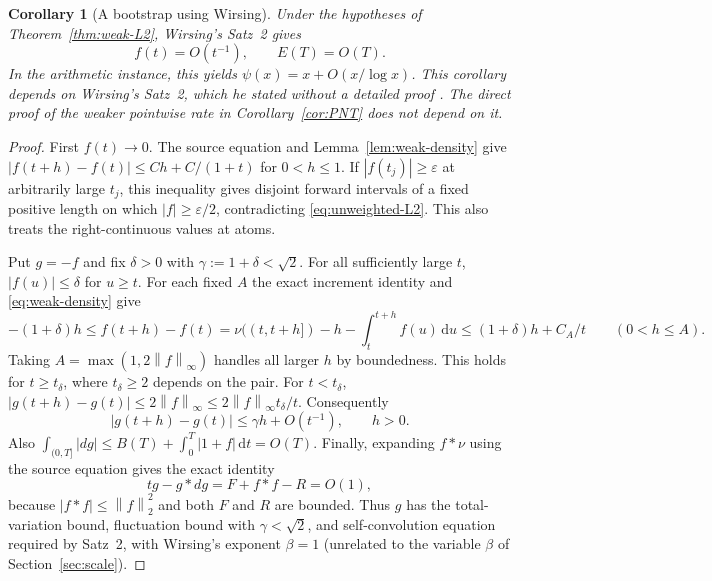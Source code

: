 \documentclass[11pt,letterpaper]{article}
\numberwithin{equation}{section}
\newtheorem{corollary}[theorem]{Corollary}
\theoremstyle{definition}
\theoremstyle{remark}
\newcommand{\dd}{\,\mathrm d}
\newcommand{\norm}[1]{\left\lVert#1\right\rVert}
\begin{document}
\begin{corollary}[A bootstrap using Wirsing]\label{cor:wirsing-bootstrap}
Under the hypotheses of Theorem~\ref{thm:weak-L2}, Wirsing's Satz~2
\cite[Section~5, p.~15]{wirsing2} gives
\begin{equation}\label{eq:wirsing-bootstrap}
 f(t)=O(t^{-1}),\qquad E(T)=O(T).
\end{equation}
In the arithmetic instance, this yields $\psi(x)=x+O(x/\log x)$.
This corollary depends on Wirsing's Satz~2, which he stated without a
detailed proof \cite[p.~15]{wirsing2}. The direct proof of the weaker
pointwise rate in Corollary~\ref{cor:PNT} does not depend on it.
\end{corollary}
\begin{proof}
First $f(t)\to0$. The source equation and Lemma~\ref{lem:weak-density}
give $|f(t+h)-f(t)|\le Ch+C/(1+t)$ for $0<h\le1$.
If $|f(t_j)|\ge\varepsilon$ at arbitrarily large $t_j$, this inequality
gives disjoint forward intervals of a fixed positive length on which
$|f|\ge\varepsilon/2$, contradicting \eqref{eq:unweighted-L2}.
This also treats the right-continuous values at atoms.

Put $g=-f$ and fix $\delta>0$ with $\gamma:=1+\delta<\sqrt2$.
For all sufficiently large $t$, $|f(u)|\le\delta$ for $u\ge t$.
For each fixed $A$ the exact increment identity and
\eqref{eq:weak-density} give
\[
 -(1+\delta)h\le f(t+h)-f(t)
 =\nu((t,t+h])-h-\int_t^{t+h}f(u)\dd u
 \le(1+\delta)h+C_A/t\qquad(0<h\le A).
\]
Taking $A=\max(1,2\norm f_\infty)$ handles all larger $h$ by boundedness.
This holds for $t\ge t_\delta$, where $t_\delta\ge2$ depends on the pair.
For $t<t_\delta$, $|g(t+h)-g(t)|\le2\norm f_\infty\le2\norm f_\infty t_\delta/t$.
Consequently
\begin{equation}\label{eq:bridge-fluctuation}
 |g(t+h)-g(t)|\le\gamma h+O(t^{-1}),\qquad h>0.
\end{equation}
Also $\int_{(0,T]}|dg|\le B(T)+\int_0^T|1+f|\dd t=O(T)$.
Finally, expanding $f*\nu$ using the source equation gives the exact identity
\begin{equation}\label{eq:bridge-selfconv}
 tg-g*dg=F+f*f-R=O(1),
\end{equation}
because $|f*f|\le\norm f_2^2$ and both $F$ and $R$ are bounded.
Thus $g$ has the total-variation bound, fluctuation bound with
$\gamma<\sqrt2$, and self-convolution equation required by Satz~2,
with Wirsing's exponent $\beta=1$ (unrelated to the variable $\beta$ of
Section~\ref{sec:scale}).


\end{proof}
\end{document}
